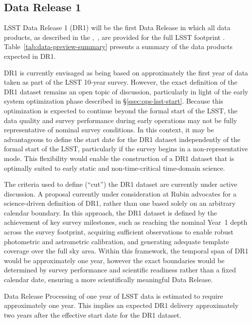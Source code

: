 \subsection{Data Release 1}
\label{ssec:dr1}

LSST Data Release 1 (DR1) will be the first Data Release in which all data products, as described in the \dpdd{},~, are provided for the full LSST footprint \citep[][]{PSTN-056}.
Table~\ref{tab:data-preview-summary} presents a summary of the data products expected in DR1.

DR1 is currently envisaged as being based on approximately the first year of data taken as part of the LSST 10-year survey.
However, the exact definition of the DR1 dataset remains an open topic of discussion, particularly in light of the early system optimization phase described in \S\ref{ssec:ops-lsst-start}.
Because this optimization is expected to continue beyond the formal start of the LSST, the data quality and survey performance during early operations may not be fully representative of nominal survey conditions.
In this context, it may be advantageous to define the start date for the DR1 dataset independently of the formal start of the LSST, particularly if the survey begins in a non-representative mode.
This flexibility would enable the construction of a DR1 dataset that is optimally suited to early static  and non-time-critical time-domain science.

The criteria used to define (“cut”) the DR1 dataset are currently under active discussion.
A proposal currently under consideration at Rubin advocates for a science-driven definition of DR1, rather than one based solely on an arbitrary calendar boundary.
In this approach, the DR1 dataset is defined by the achievement of key survey milestones, such as reaching the nominal Year~1 depth across the survey footprint, acquiring sufficient observations to enable robust photometric and astrometric calibration, and generating adequate template coverage over the full sky area.
Within this framework, the temporal span of DR1 would be approximately one year, however the exact boundaries would be determined by survey performance and scientific readiness rather than a fixed calendar date, ensuring a more scientifically meaningful  Data Release.

Data Release Processing of one year of LSST data is estimated to require approximately one year. 
This implies an expected DR1 delivery approximately two years after the effective start date for the DR1 dataset.